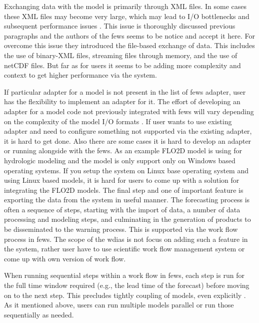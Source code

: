 Exchanging data with the model is primarily through XML files. In some cases these XML files may become very large, which may lead to I/O bottlenecks and subsequent performance issues \cite{Werner2013TheSystem}. This issue is thoroughly discussed previous paragraphs and the authors of the \acrshort{fews} \cite{Werner2013TheSystem} seems to be notice and accept it here. For overcome this issue they introduced the file-based exchange of data. This includes the use of binary-XML files, streaming files through memory, and the use of \acrshort{netCDF} files. But far as for users it seems to be adding more complexity and context to get higher performance via the system.

If particular adapter for a model is not present in the list of \acrshort{fews} adapter, user has the flexibility to implement an adapter for it. The effort of developing an adapter for a model code not previously integrated with \acrshort{fews} will vary depending on the complexity of the model I/O formats \cite{Werner2013TheSystem}. If user wants to use existing adapter and need to configure something not supported via the existing adapter, it is hard to get done. Also there are some cases it is hard to develop an adapter or running alongside with the \acrshort{fews}. As an example FLO2D model is using for hydrologic modeling and the model is only support only on Windows based operating systems. If you setup the system on Linux base operating system and using Linux based models, it is hard for users to come up with a solution for integrating the FLO2D models.
The final step and one of important feature is exporting the data from the system in useful manner.
The forecasting process is often a sequence of steps, starting with the import of data, a number of data processing and modeling steps, and culminating in the generation of products to be disseminated to the warning process. This is supported via the work flow process in \acrshort{fews}. The scope of the \acrshort{wdias} is not focus on adding such a feature in the system, rather user have to use scientific work flow management system or come up with own version of work flow.

When running sequential steps within a work flow in \acrshort{fews}, each step is run for the full time window required (e.g., the lead time of the forecast) before moving on to the next step. This precludes tightly coupling of models, even explicitly \cite{Werner2013TheSystem}. As it mentioned above, users can run multiple models parallel or run those sequentially as needed. 
